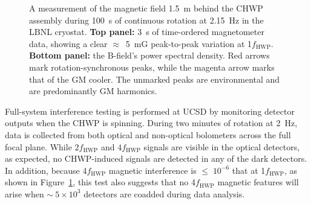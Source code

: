 \begin{figure}[!t]
    \centering
    \caption{A measurement of the magnetic field 1.5~m behind the CHWP assembly during 100~s of continuous rotation at 2.15~Hz in the LBNL cryostat. \textbf{Top panel:} 3~s of time-ordered magnetometer data, showing a clear $\approx$~5~mG peak-to-peak variation at 1$f_{\mathrm{HWP}}$. \textbf{Bottom panel:} the B-field's power spectral density. Red arrows mark rotation-synchronous peaks, while the magenta arrow marks that of the GM cooler. The unmarked peaks are environmental and are predominantly GM harmonics.}
    \label{fig:mag_spec}
\end{figure}

Full-system interference testing is performed at UCSD by monitoring detector outputs when the CHWP is spinning. During two minutes of rotation at 2~Hz, data is collected from both optical and non-optical bolometers across the full focal plane. While $2 f_{\mathrm{HWP}}$ and $4 f_{\mathrm{HWP}}$ signals are visible in the optical detectors, as expected, no CHWP-induced signals are detected in any of the dark detectors. In addition, because 4$f_{\mathrm{HWP}}$ magnetic interference is $\leq \; 10^{-6}$ that at 1$f_{\mathrm{HWP}}$, as shown in Figure~\ref{fig:mag_spec}, this test also suggests that no 4$f_{\mathrm{HWP}}$ magnetic features will arise when $\sim \: 5 \times 10^{3}$ detectors are coadded during data analysis.


